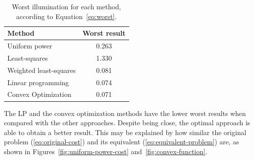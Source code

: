 \documentclass[11pt,a4paper]{article}
\begin{document}
\begin{table}[!htb]
    \centering
    \caption{Worst illumination for each method, according to Equation~\ref{eq:worst}.}
    \begin{tabular}{lc}
        \hline
        \textbf{Method} & \textbf{Worst result}\\
        \hline
        Uniform power           & 0.263 \\
        Least-squares           & 1.330 \\
        Weighted least-squares  & 0.081 \\
        Linear programming      & 0.074 \\
        Convex Optimization     & 0.071 \\
        \hline
    \end{tabular}\label{tab:worst}
\end{table}

The LP and the convex optimization methods have the lower worst results when compared with the other approaches. Despite being close, the optimal approach is able to obtain a better result. This may be explained by how similar the original problem (\ref{eq:original-cost}) and its equivalent (\ref{eq:equivalent-problem}) are, as shown in Figures~\ref{fig:uniform-power-cost} and~\ref{fig:convex-function}.
\end{document}

